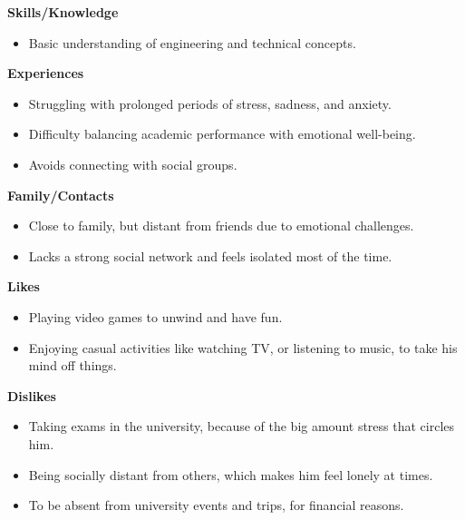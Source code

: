 \begin{center} \textbf{Skills/Knowledge} \end{center}
\begin{itemize}
    \item Basic understanding of engineering and technical concepts.
\end{itemize}

\begin{center} \textbf{Experiences} \end{center}
\begin{itemize}
    \item Struggling with prolonged periods of stress, sadness, and anxiety.
    \item Difficulty balancing academic performance with emotional well-being.
    \item Avoids connecting with social groups.
\end{itemize}

\begin{center} \textbf{Family/Contacts} \end{center}
\begin{itemize}
    \item Close to family, but distant from friends due to emotional challenges.
    \item Lacks a strong social network and feels isolated most of the time.
\end{itemize}

\begin{center} \textbf{Likes} \end{center}
\begin{itemize}
    \item Playing video games to unwind and have fun.
    \item Enjoying casual activities like watching TV, or listening to music, to take his mind off things.
\end{itemize}

\begin{center} \textbf{Dislikes} \end{center}
\begin{itemize}
    \item Taking exams in the university, because of the big amount stress that circles him.
    \item Being socially distant from others, which makes him feel lonely at times.
    \item To be absent from university events and trips, for financial reasons.
\end{itemize}

